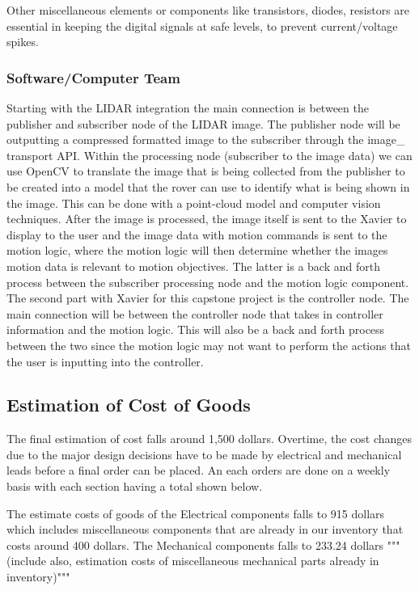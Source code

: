\documentclass[a4paper, 10pt]{article}
\begin{document}
		Other miscellaneous elements or components like transistors, diodes, resistors are essential in keeping the digital signals at safe levels, to prevent current/voltage spikes.
		

		\subsubsection{Software/Computer Team}
	
Starting with the LIDAR integration the main connection is between the publisher and subscriber node of the LIDAR image. The publisher node will be outputting a compressed formatted image to the subscriber through the image\_ transport API. Within the processing node (subscriber to the image data) we can use OpenCV to translate the image that is being collected from the publisher to be created into a model that the rover can use to identify what is being shown in the image. This can be done with a point-cloud model and computer vision techniques. After the image is processed, the image itself is sent to the Xavier to display to the user and the image data with motion commands is sent to the motion logic, where the motion logic will then determine whether the images motion data is relevant to motion objectives. The latter is a back and forth process between the subscriber processing node and the motion logic component. 
The second part with Xavier for this capstone project is the controller node. The main connection will be between the controller node that takes in controller information and the motion logic. This will also be a back and forth process between the two since the motion logic may not want to perform the actions that the user is inputting into the controller. 

	\subsection{Estimation of Cost of Goods}
	
	The final estimation of cost falls around 1,500 dollars. Overtime, the cost changes due to the major design decisions have to be made by electrical and mechanical leads before a final order can be placed. An each orders are done on a weekly basis with each section having a total shown below. 
	
	The estimate costs of goods of the Electrical components falls to 915 dollars which includes miscellaneous components that are already in our inventory that costs around 400 dollars. The Mechanical components falls to 233.24 dollars """(include also, estimation costs of miscellaneous mechanical parts already in inventory)"""
\end{document}

